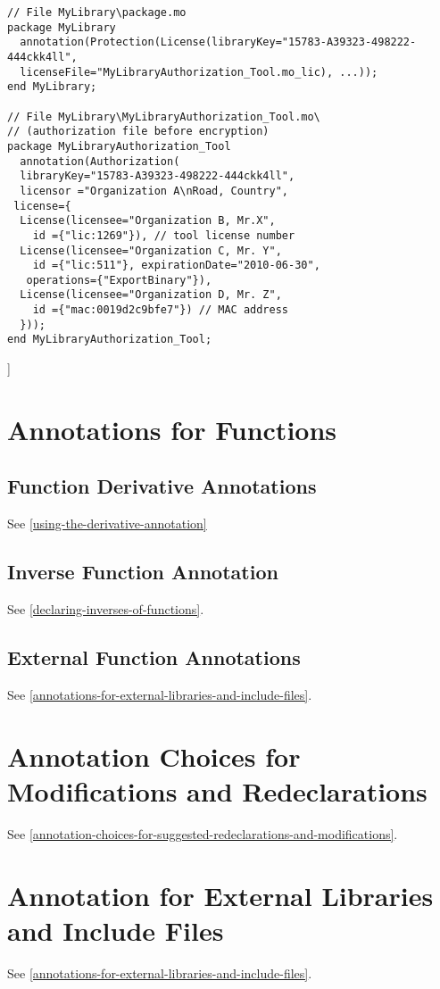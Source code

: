 \begin{lstlisting}[language=modelica]
// File MyLibrary\package.mo
package MyLibrary
  annotation(Protection(License(libraryKey="15783-A39323-498222-444ckk4ll",
  licenseFile="MyLibraryAuthorization_Tool.mo_lic), ...));
end MyLibrary;

// File MyLibrary\MyLibraryAuthorization_Tool.mo\
// (authorization file before encryption)
package MyLibraryAuthorization_Tool
  annotation(Authorization(
  libraryKey="15783-A39323-498222-444ckk4ll",
  licensor ="Organization A\nRoad, Country",
 license={
  License(licensee="Organization B, Mr.X",
    id ={"lic:1269"}), // tool license number
  License(licensee="Organization C, Mr. Y",
    id ={"lic:511"}, expirationDate="2010-06-30",
   operations={"ExportBinary"}),
  License(licensee="Organization D, Mr. Z",
    id ={"mac:0019d2c9bfe7"}) // MAC address
  }));
end MyLibraryAuthorization_Tool;
\end{lstlisting}
{]}

\section{Annotations for Functions}

\subsection{Function Derivative Annotations}

See \ref{using-the-derivative-annotation}

\subsection{Inverse Function Annotation}

See \ref{declaring-inverses-of-functions}.

\subsection{External Function Annotations}

See \ref{annotations-for-external-libraries-and-include-files}.

\section{Annotation Choices for Modifications and Redeclarations}

See \ref{annotation-choices-for-suggested-redeclarations-and-modifications}.

\section{Annotation for External Libraries and Include Files}

See \ref{annotations-for-external-libraries-and-include-files}.
